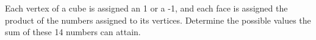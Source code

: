Each vertex of a cube is assigned an 1 or a -1, and each face is assigned the product of the numbers assigned to its vertices. Determine the possible values the sum of these 14 numbers can attain.